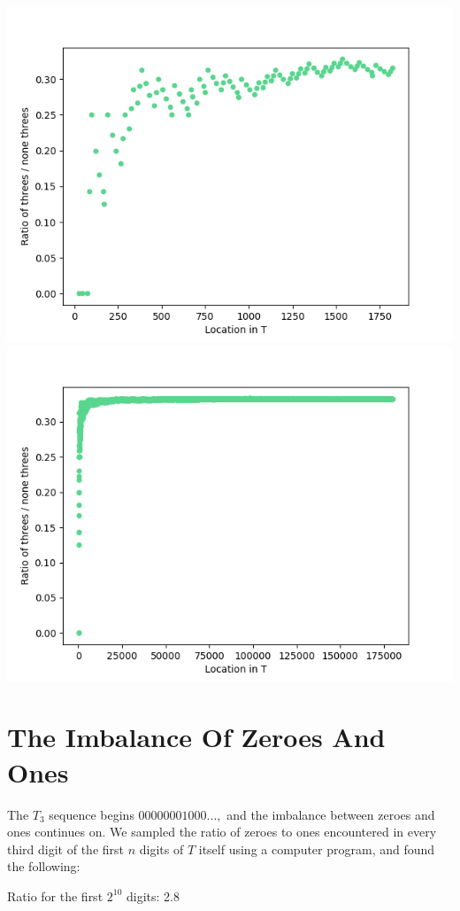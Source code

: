 \documentclass{article}
\begin{document}
\includegraphics[scale=0.4]{lambda_ratio_from_data1_ones_100}
\includegraphics[scale=0.4]{lambda_ratio_from_data1_ones_10000}

\section{The Imbalance Of Zeroes And Ones}

The $T_3$ sequence begins $00000001000...,$ and the imbalance between zeroes and ones continues on. We sampled the ratio of zeroes to ones encountered in every third digit of the first $n$ digits of $T$ itself using a computer program, and found the following:

Ratio for the first $2^{10}$ digits: 2.8
\end{document}
